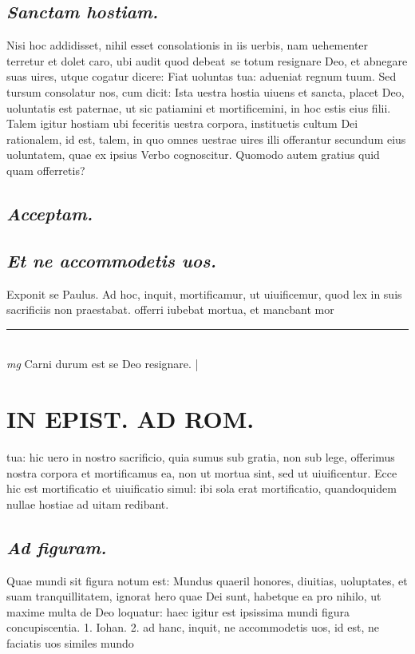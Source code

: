 \documentclass{article}
\begin{document}
\begin{pages}
\subsection*{\textit{Sanctam hostiam. }}\pstart Nisi hoc addidisset, nihil esset consolationis in iis uerbis, nam uehementer terretur et dolet caro, ubi audit quod debeat se totum resignare Deo, et abnegare suas uires, utque cogatur dicere: Fiat uoluntas tua: adueniat regnum tuum. Sed tursum consolatur nos, cum dicit: Ista uestra hostia uiuens et sancta, placet Deo, uoluntatis est paternae, ut sic patiamini et mortificemini, in hoc estis eius filii. Talem igitur hostiam ubi feceritis uestra corpora, instituetis cultum Dei rationalem, id est, talem, in quo omnes uestrae uires illi offerantur secundum eius uoluntatem, quae ex ipsius Verbo cognoscitur. Quomodo autem gratius quid quam offerretis?  \pend
{}
{}
\subsection*{\textit{Acceptam. }}
{}
\subsection*{\textit{Et ne accommodetis uos. }}\pstart Exponit se Paulus. Ad hoc, inquit, mortificamur, ut uiuificemur, quod lex in suis sacrificiis non praestabat. offerri iubebat mortua, et mancbant mor\pend
\vspace{0.5cm}\noindent
\vspace{0.2cm}\rule{1cm}{0.2pt}\\ 
\hspace{0.2cm}\textit{mg}
\footnotesize Carni durum est se Deo resignare.  
\normalsize| 
\section*{IN EPIST. AD ROM.  }
\marginpar{[ p.141 ]}\pstart tua: hic uero in nostro sacrificio, quia sumus sub gratia, non sub lege, offerimus nostra corpora et mortificamus ea, non ut mortua sint, sed ut uiuificentur. Ecce hic est mortificatio et uiuificatio simul: ibi sola erat mortificatio, quandoquidem nullae hostiae ad uitam redibant.   \pend
{}
{}
\subsection*{\textit{Ad figuram. }}\pstart Quae mundi sit figura notum est: Mundus quaeril honores, diuitias, uoluptates, et suam tranquillitatem, ignorat hero quae Dei sunt, habetque ea pro nihilo, ut maxime multa de Deo loquatur: haec igitur est ipsissima mundi figura concupiscentia. 1. Iohan. 2.  ad hanc, inquit, ne accommodetis uos, id est, ne faciatis uos similes mundo\pend
{}
{}

\end{pages}
\end{document}

